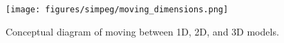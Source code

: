 \begin{figure}[!htbp]
\begin{center}
\texttt{[image: figures/simpeg/moving\_dimensions.png]}
\end{center}
\caption{Conceptual diagram of moving between 1D, 2D, and 3D models.}
\label{fig:simpeg-moving_dimensions}
\end{figure}
